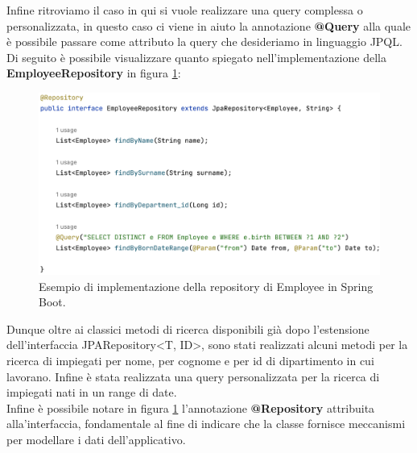 Infine ritroviamo il caso in qui si vuole realizzare una query complessa o personalizzata, in questo caso ci viene in aiuto la annotazione \textbf{@Query} alla quale è possibile passare come attributo la query che desideriamo in linguaggio JPQL. Di seguito è possibile visualizzare quanto spiegato nell'implementazione della \textbf{EmployeeRepository} in figura \ref{employee-repository}:
\FloatBarrier
\begin{figure}[!ht]
\centering
\includegraphics[width=1\linewidth]{immagini/employee_repository.png}
\caption{Esempio di implementazione della repository di Employee in Spring Boot.}
\label{employee-repository}
\end{figure}
\FloatBarrier
Dunque oltre ai classici metodi di ricerca disponibili già dopo l'estensione dell'interfaccia JPARepository<T, ID>, sono stati realizzati alcuni metodi per la ricerca di impiegati per nome, per cognome e per id di dipartimento in cui lavorano. Infine è stata realizzata una query personalizzata per la ricerca di impiegati nati in un range di date.\\
Infine è possibile notare in figura \ref{employee-repository} l'annotazione \textbf{@Repository} attribuita alla'interfaccia, fondamentale al fine di indicare che la classe fornisce meccanismi per modellare i dati dell'applicativo.
